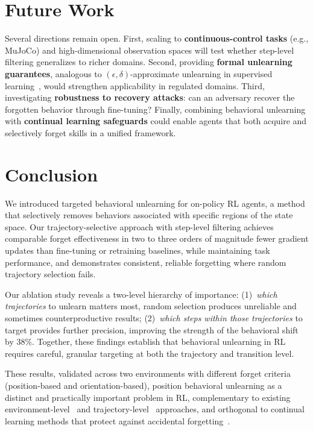 \documentclass[sigconf]{acmart}
\begin{document}
\section{Future Work}
\balance

Several directions remain open. First, scaling to \textbf{continuous-control tasks} (e.g., MuJoCo) and high-dimensional observation spaces will test whether step-level filtering generalizes to richer domains. Second, providing \textbf{formal unlearning guarantees}, analogous to $(\epsilon, \delta)$-approximate unlearning in supervised learning~\cite{ginart2019makingaiforgetyou}, would strengthen applicability in regulated domains. Third, investigating \textbf{robustness to recovery attacks}: can an adversary recover the forgotten behavior through fine-tuning? Finally, combining behavioral unlearning with \textbf{continual learning safeguards} could enable agents that both acquire and selectively forget skills in a unified framework.

\section{Conclusion}

We introduced targeted behavioral unlearning for on-policy RL agents, a method that selectively removes behaviors associated with specific regions of the state space. Our trajectory-selective approach with step-level filtering achieves comparable forget effectiveness in two to three orders of magnitude fewer gradient updates than fine-tuning or retraining baselines, while maintaining task performance, and demonstrates consistent, reliable forgetting where random trajectory selection fails.

Our ablation study reveals a two-level hierarchy of importance: (1)~\emph{which trajectories} to unlearn matters most, random selection produces unreliable and sometimes counterproductive results; (2)~\emph{which steps within those trajectories} to target provides further precision, improving the strength of the behavioral shift by 38\%. Together, these findings establish that behavioral unlearning in RL requires careful, granular targeting at both the trajectory and transition level.

These results, validated across two environments with different forget criteria (position-based and orientation-based), position behavioral unlearning as a distinct and practically important problem in RL, complementary to existing environment-level~\cite{ye2024reinforcementunlearning} and trajectory-level~\cite{gong2024trajdeleterenablingtrajectoryforgetting} approaches, and orthogonal to continual learning methods that protect against accidental forgetting~\cite{kirkpatrick2017overcoming}.
\end{document}
